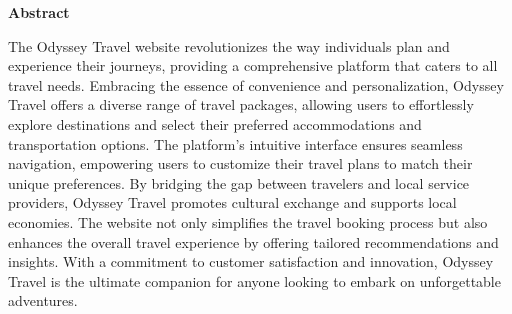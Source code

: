 \documentclass{scrreprt}
\begin{document}
\begin{center}
    \parbox{0.8\textwidth}{ 
        \centering
        \textbf{Abstract}
    }
\end{center}

The Odyssey Travel website revolutionizes the way individuals plan and experience their journeys, providing a comprehensive platform that caters to all travel needs. Embracing the essence of convenience and personalization, Odyssey Travel offers a diverse range of travel packages, allowing users to effortlessly explore destinations and select their preferred accommodations and transportation options. The platform’s intuitive interface ensures seamless navigation, empowering users to customize their travel plans to match their unique preferences. By bridging the gap between travelers and local service providers, Odyssey Travel promotes cultural exchange and supports local economies. The website not only simplifies the travel booking process but also enhances the overall travel experience by offering tailored recommendations and insights. With a commitment to customer satisfaction and innovation, Odyssey Travel is the ultimate companion for anyone looking to embark on unforgettable adventures.
\end{document}
